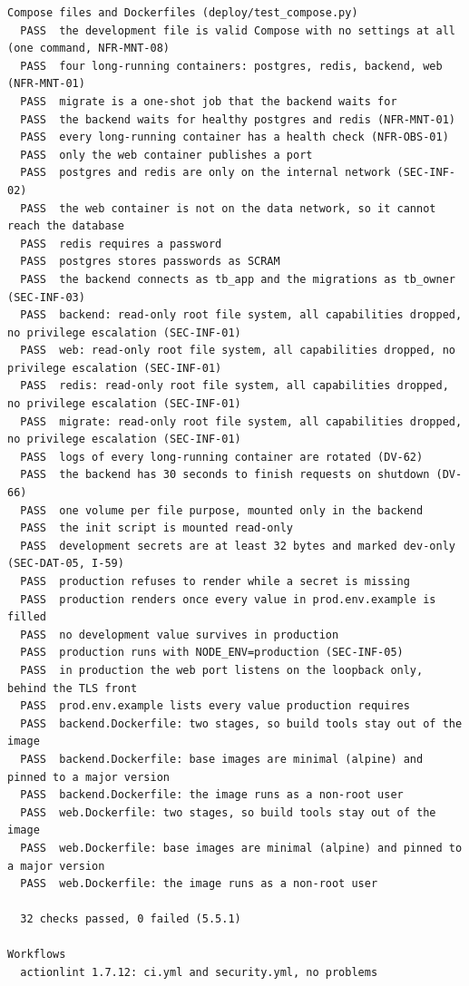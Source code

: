\documentclass[11pt,a4paper]{article}
\begin{document}
{\begin{verbatim}
Compose files and Dockerfiles (deploy/test_compose.py)
  PASS  the development file is valid Compose with no settings at all (one command, NFR-MNT-08)
  PASS  four long-running containers: postgres, redis, backend, web (NFR-MNT-01)
  PASS  migrate is a one-shot job that the backend waits for
  PASS  the backend waits for healthy postgres and redis (NFR-MNT-01)
  PASS  every long-running container has a health check (NFR-OBS-01)
  PASS  only the web container publishes a port
  PASS  postgres and redis are only on the internal network (SEC-INF-02)
  PASS  the web container is not on the data network, so it cannot reach the database
  PASS  redis requires a password
  PASS  postgres stores passwords as SCRAM
  PASS  the backend connects as tb_app and the migrations as tb_owner (SEC-INF-03)
  PASS  backend: read-only root file system, all capabilities dropped, no privilege escalation (SEC-INF-01)
  PASS  web: read-only root file system, all capabilities dropped, no privilege escalation (SEC-INF-01)
  PASS  redis: read-only root file system, all capabilities dropped, no privilege escalation (SEC-INF-01)
  PASS  migrate: read-only root file system, all capabilities dropped, no privilege escalation (SEC-INF-01)
  PASS  logs of every long-running container are rotated (DV-62)
  PASS  the backend has 30 seconds to finish requests on shutdown (DV-66)
  PASS  one volume per file purpose, mounted only in the backend
  PASS  the init script is mounted read-only
  PASS  development secrets are at least 32 bytes and marked dev-only (SEC-DAT-05, I-59)
  PASS  production refuses to render while a secret is missing
  PASS  production renders once every value in prod.env.example is filled
  PASS  no development value survives in production
  PASS  production runs with NODE_ENV=production (SEC-INF-05)
  PASS  in production the web port listens on the loopback only, behind the TLS front
  PASS  prod.env.example lists every value production requires
  PASS  backend.Dockerfile: two stages, so build tools stay out of the image
  PASS  backend.Dockerfile: base images are minimal (alpine) and pinned to a major version
  PASS  backend.Dockerfile: the image runs as a non-root user
  PASS  web.Dockerfile: two stages, so build tools stay out of the image
  PASS  web.Dockerfile: base images are minimal (alpine) and pinned to a major version
  PASS  web.Dockerfile: the image runs as a non-root user
  
  32 checks passed, 0 failed (5.5.1)

Workflows
  actionlint 1.7.12: ci.yml and security.yml, no problems


\end{verbatim}}
\end{document}
